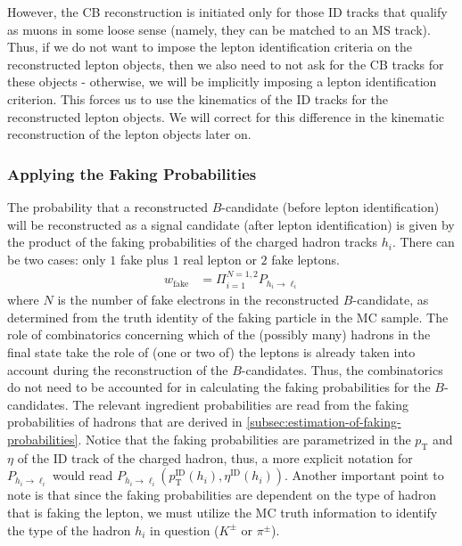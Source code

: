 However, the CB reconstruction is initiated only for those ID tracks that qualify as muons in some loose sense (namely, they can be matched to an MS track). Thus, if we do not want to impose the lepton identification criteria on the reconstructed lepton objects, then we also need to not ask for the CB tracks for these objects - otherwise, we will be implicitly imposing a lepton identification criterion. %
This forces us to use the kinematics of the ID tracks for the reconstructed lepton objects. %
We will correct for this difference in the kinematic reconstruction of the lepton objects later on. %
\subsubsection{Applying the Faking Probabilities}
The probability that a reconstructed $B$-candidate (before lepton identification) will be reconstructed as a signal candidate (after lepton identification) is given by the product of the faking probabilities of the charged hadron tracks $h_i$. %
There can be two cases: only $1$ fake plus $1$ real lepton or $2$ fake leptons. %
\begin{align}
    w_{\text{fake}} &= \Pi_{i=1}^{N=1,2}P_{h_i \to \ell_i}
\end{align}
where $N$ is the number of fake electrons in the reconstructed $B$-candidate, as determined from the truth identity of the faking particle in the MC sample. %
The role of combinatorics concerning which of the (possibly many) hadrons in the final state take the role of (one or two of) the leptons is already taken into account during the reconstruction of the $B$-candidates. %
Thus, the combinatorics do not need to be accounted for in calculating the faking probabilities for the $B$-candidates. %
The relevant ingredient probabilities are read from the faking probabilities of hadrons that are derived in \ref{subsec:estimation-of-faking-probabilities}. Notice that the faking probabilities are parametrized in the $p_{\text{T}}$ and $\eta$ of the ID track of the charged hadron, thus, a more explicit notation for $P_{h_i \to \ell_i}$ would read $P_{h_i \to \ell_i}(p_{\text{T}}^{\text{ID}}(h_i), \eta^{\text{ID}}(h_i))$. %
Another important point to note is that since the faking probabilities are dependent on the type of hadron that is faking the lepton, we must utilize the MC truth information to identify the type of the hadron $h_i$ in question ($K^\pm$ or $\pi^\pm$). %
\label{subsec:applying-the-faking-probabilities}
